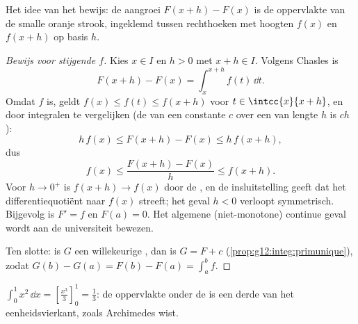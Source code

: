 \begin{omfigure}

{\small Het idee van het bewijs: de aangroei $F(x+h) - F(x)$ is de oppervlakte
van de smalle oranje strook, ingeklemd tussen rechthoeken met hoogten $f(x)$
en $f(x+h)$ op basis $h$.}
\end{omfigure}

\begin{proof}[Bewijs voor stijgende $f$]
Kies $x \in I$ en $h > 0$ met $x + h \in I$. Volgens Chasles is
\[
F(x+h) - F(x) = \int_x^{x+h} f(t)\,\dd t .
\]
Omdat $f$  is, geldt $f(x) \leq f(t) \leq f(x+h)$ voor
$t \in \intcc{x}{x+h}$, en door integralen te vergelijken (de  van
een constante $c$ over een  van lengte $h$ is $ch$):
\[
h\,f(x) \leq F(x+h) - F(x) \leq h\,f(x+h),
\]
dus
\[
f(x) \leq \frac{F(x+h) - F(x)}{h} \leq f(x+h).
\]
Voor $h \to 0^+$ is $f(x+h) \to f(x)$ door de , en de
insluitstelling geeft dat het differentiequotiënt naar $f(x)$ streeft; het
geval $h < 0$ verloopt symmetrisch. Bijgevolg is $F' = f$ en $F(a) = 0$. Het
algemene (niet-monotone) continue geval wordt aan de universiteit bewezen.

Ten slotte: is $G$ een willekeurige , dan is $G = F + c$
(\cref{prop:g12:integ:primunique}), zodat
$G(b) - G(a) = F(b) - F(a) = \int_a^b f$.
\end{proof}

\begin{example}
$\displaystyle\int_0^1 x^2\,\dd x = \left[\frac{x^3}{3}\right]_0^1 =
\frac13$: de oppervlakte onder de  is een derde van het
eenheidsvierkant, zoals Archimedes wist.
\end{example}


